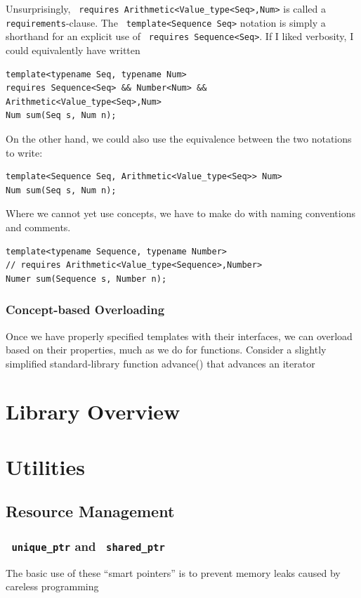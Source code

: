 \documentclass[11pt]{article}
\let\OldTexttt\texttt
\renewcommand{\texttt}[1]{\OldTexttt{\color{MidnightBlue} #1}}
\begin{document}
Unsurprisingly, \texttt{requires Arithmetic<Value\_type<Seq>,Num>} is called a \texttt{requirements}-clause. The
\texttt{template<Sequence Seq>} notation is simply a shorthand for an explicit use of \texttt{requires
    Sequence<Seq>}. If I liked verbosity, I could equivalently have written
\begin{verbatim}
template<typename Seq, typename Num>
requires Sequence<Seq> && Number<Num> && Arithmetic<Value_type<Seq>,Num>
Num sum(Seq s, Num n);
\end{verbatim}
On the other hand, we could also use the equivalence between the two notations to write:
\begin{verbatim}
template<Sequence Seq, Arithmetic<Value_type<Seq>> Num>
Num sum(Seq s, Num n);
\end{verbatim}
Where we cannot yet use concepts, we have to make do with naming conventions and comments.
\begin{verbatim}
template<typename Sequence, typename Number>
// requires Arithmetic<Value_type<Sequence>,Number>
Numer sum(Sequence s, Number n);
\end{verbatim}
\subsubsection{Concept-based Overloading}
\label{sec:orgb6c5c00}
Once we have properly specified templates with their interfaces, we can overload based on their
properties, much as we do for functions. Consider a slightly simplified standard-library
function advance() that advances an iterator
\section{Library Overview}
\label{sec:org6e49352}

\section{Utilities}
\label{sec:org32231d2}
\subsection{Resource Management}
\label{sec:orgcdf589c}
\subsubsection{\texttt{unique\_ptr} and \texttt{shared\_ptr}}
\label{sec:org392f6d5}
The basic use of these ``smart pointers''  is to prevent memory leaks caused by careless
programming
\end{document}
